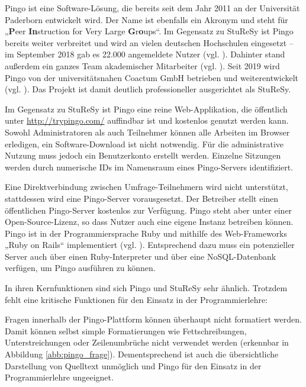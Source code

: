 Pingo ist eine Software-Lösung, die bereits seit dem Jahr 2011 an der Universität Paderborn entwickelt wird. Der Name ist ebenfalls ein Akronym und steht für „\textbf{P}eer \textbf{In}struction for Very Large \textbf{G}r\textbf{o}ups“. Im Gegensatz zu StuReSy ist Pingo bereits weiter verbreitet und wird an vielen deutschen Hochschulen eingesetzt – im September 2018 gab es 22.000 angemeldete Nutzer (vgl. \cite{web:pingo_zukunft}). Dahinter stand außerdem ein ganzes Team akademischer Mitarbeiter (vgl. \cite{web:pingo_team}). Seit 2019 wird Pingo von der universitätsnahen Coactum GmbH betrieben und weiterentwickelt (vgl. \cite{web:pingo_coactum}). Das Projekt ist damit deutlich professioneller ausgerichtet als StuReSy.

Im Gegensatz zu StuReSy ist Pingo eine reine Web-Applikation, die öffentlich unter \url{http://trypingo.com/} auffindbar ist und kostenlos genutzt werden kann. Sowohl Administratoren als auch Teilnehmer können alle Arbeiten im Browser erledigen, ein Software-Download ist nicht notwendig. Für die administrative Nutzung muss jedoch ein Benutzerkonto erstellt werden. Einzelne Sitzungen werden durch numerische IDs im Namensraum eines Pingo-Servers identifiziert.


Eine Direktverbindung zwischen Umfrage-Teilnehmern wird nicht unterstützt, stattdessen wird eine Pingo-Server vorausgesetzt. Der Betreiber stellt einen öffentlichen Pingo-Server kostenlos zur Verfügung. Pingo steht aber unter einer Open-Source-Lizenz, so dass Nutzer auch eine eigene Instanz betreiben können. Pingo ist in der Programmiersprache Ruby und mithilfe des Web-Frameworks „Ruby on Rails“ implementiert (vgl. \cite{web:pingo_github}). Entsprechend dazu muss ein potenzieller Server auch über einen Ruby-Interpreter und über eine NoSQL-Datenbank verfügen, um Pingo ausführen zu können.

In ihren Kernfunktionen sind sich Pingo und StuReSy sehr ähnlich. Trotzdem fehlt eine kritische Funktionen für den Einsatz in der Programmierlehre:

Fragen innerhalb der Pingo-Plattform können überhaupt nicht formatiert werden. Damit können selbst simple Formatierungen wie Fettschreibungen, Unterstreichungen oder Zeilenumbrüche nicht verwendet werden (erkennbar in Abbildung \ref{abb:pingo_frage}). Dementsprechend ist auch die übersichtliche Darstellung von Quelltext unmöglich und Pingo für den Einsatz in der Programmierlehre ungeeignet.


